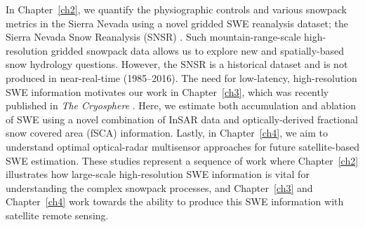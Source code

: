 In Chapter~\ref{ch2}, we quantify the physiographic controls and various snowpack metrics in the Sierra Nevada using a novel gridded SWE reanalysis dataset; the Sierra Nevada Snow Reanalysis (SNSR) \citep{margulisLandsatEraSierraNevada2016}. Such mountain-range-scale high-resolution gridded snowpack data allows us to explore new and spatially-based snow hydrology questions. However, the SNSR is a historical dataset and is not produced in near-real-time (1985--2016). The need for low-latency, high-resolution SWE information motivates our work in Chapter~\ref{ch3}, which was recently published in \emph{The Cryosphere} \citep{tarriconeEstimatingSnowAccumulation2023a}. Here, we estimate both accumulation and ablation of SWE using a novel combination of InSAR data and optically-derived fractional snow covered area (fSCA) information. Lastly, in Chapter~\ref{ch4}, we aim to understand optimal optical-radar multisensor approaches for future satellite-based SWE estimation. These studies represent a sequence of work where Chapter~\ref{ch2} illustrates how large-scale high-resolution SWE information is vital for understanding the complex snowpack processes, and Chapter~\ref{ch3} and Chapter~\ref{ch4} work towards the ability to produce this SWE information with satellite remote sensing.




